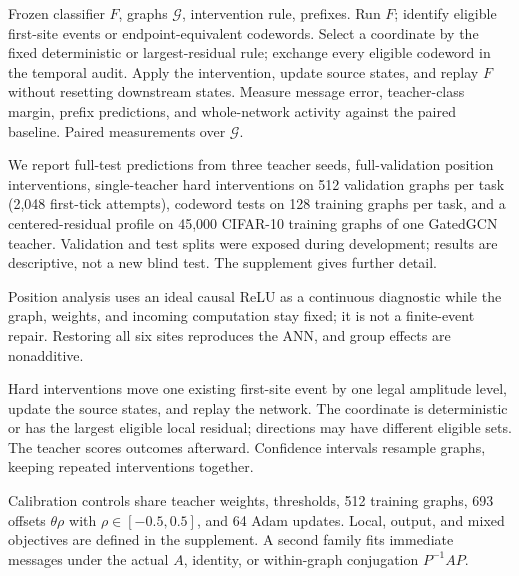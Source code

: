 \documentclass[10pt,twocolumn,letterpaper]{article}
\begin{document}
\begin{algorithm}[t]
\caption{Finite-Event Fidelity Audit}
\label{alg:audit}
\small
\setlength{\algorithmicindent}{0.9em}
\renewcommand{\baselinestretch}{0.92}\selectfont
\begin{algorithmic}[1]
\REQUIRE Frozen classifier $F$, graphs $\mathcal G$, intervention rule, prefixes.
\STATE Run $F$; identify eligible first-site events or endpoint-equivalent codewords.
\STATE Select a coordinate by the fixed deterministic or largest-residual rule; exchange every eligible codeword in the temporal audit.
\STATE Apply the intervention, update source states, and replay $F$ without resetting downstream states.
\STATE Measure message error, teacher-class margin, prefix predictions, and whole-network activity against the paired baseline.
\ENDFOR
\RETURN Paired measurements over $\mathcal G$.
\end{algorithmic}
\end{algorithm}

We report full-test predictions from three teacher seeds, full-validation position interventions, single-teacher hard interventions on 512 validation graphs per task (2{,}048 first-tick attempts), codeword tests on 128 training graphs per task, and a centered-residual profile on 45{,}000 CIFAR-10 training graphs of one GatedGCN teacher. Validation and test splits were exposed during development; results are descriptive, not a new blind test. The supplement gives further detail.

Position analysis uses an ideal causal ReLU as a continuous diagnostic while the graph, weights, and incoming computation stay fixed; it is not a finite-event repair. Restoring all six sites reproduces the ANN, and group effects are nonadditive.

Hard interventions move one existing first-site event by one legal amplitude level, update the source states, and replay the network. The coordinate is deterministic or has the largest eligible local residual; directions may have different eligible sets. The teacher scores outcomes afterward. Confidence intervals resample graphs, keeping repeated interventions together.

Calibration controls share teacher weights, thresholds, 512 training graphs, 693 offsets $\theta\rho$ with $\rho\in[-0.5,0.5]$, and 64 Adam updates. Local, output, and mixed objectives are defined in the supplement. A second family fits immediate messages under the actual $A$, identity, or within-graph conjugation $P^{-1}AP$.
\end{document}
